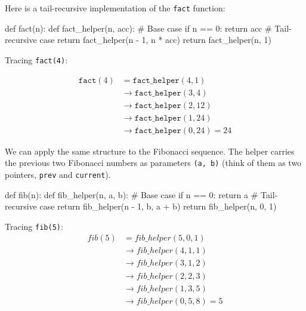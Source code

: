 \begin{example}[Factorial]{}
Here is a tail-recursive implementation of the \texttt{fact} function:
\begin{codeblock}
def fact(n):
    def fact_helper(n, acc):
        # Base case
        if n == 0:
            return acc
        # Tail-recursive case
        return fact_helper(n - 1, n * acc)
    return fact_helper(n, 1)
\end{codeblock}

Tracing \texttt{fact(4)}:

\[
\begin{aligned}
\texttt{fact}(4) &= \texttt{fact\_helper}(4, 1) \\
        &\rightarrow \texttt{fact\_helper}(3, 4) \\
        &\rightarrow \texttt{fact\_helper}(2, 12) \\
        &\rightarrow \texttt{fact\_helper}(1, 24) \\
        &\rightarrow \texttt{fact\_helper}(0, 24) = 24
\end{aligned}
\]
\end{example}


\begin{example}[Fibonacci]{}
We can apply the same structure to the Fibonacci sequence.  
The helper carries the previous two Fibonacci numbers as parameters \texttt{(a, b)} (think of them as two pointers, \texttt{prev} and \texttt{current}).
\begin{codeblock}
def fib(n):
    def fib_helper(n, a, b):
        # Base case
        if n == 0:
            return a
        # Tail-recursive case
        return fib_helper(n - 1, b, a + b)
    return fib_helper(n, 0, 1)
\end{codeblock}
Tracing \texttt{fib(5)}:
\[
\begin{aligned}
fib(5) &= fib\_helper(5, 0, 1) \\
       &\rightarrow fib\_helper(4, 1, 1) \\
       &\rightarrow fib\_helper(3, 1, 2) \\
       &\rightarrow fib\_helper(2, 2, 3) \\
       &\rightarrow fib\_helper(1, 3, 5) \\
       &\rightarrow fib\_helper(0, 5, 8) = 5
\end{aligned}
\]
\end{example}


